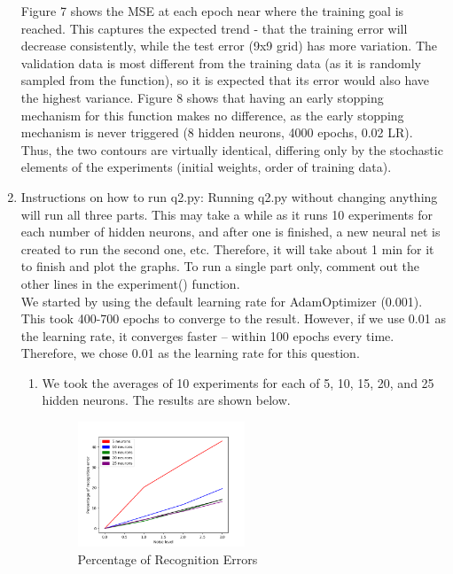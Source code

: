 \documentclass[11pt]{article}
\begin{document}
\begin{enumerate}
Figure 7 shows the MSE at each epoch near where the training goal is reached. This captures the expected trend - that the training error will decrease consistently, while the test error (9x9 grid) has more variation. The validation data is most different from the training data (as it is randomly sampled from the function), so it is expected that its error would also have the highest variance.\newline
\newline
Figure 8 shows that having an early stopping mechanism for this function makes no difference, as the early stopping mechanism is never triggered (8 hidden neurons, 4000 epochs, 0.02 LR). Thus, the two contours are virtually identical, differing only by the stochastic elements of the experiments (initial weights, order of training data). 

\pagebreak
\item Instructions on how to run q2.py:\newline
\newline
Running q2.py without changing anything will run all three parts. This may take a while as it runs 10 experiments for each number of hidden neurons, and after one is finished, a new neural net is created to run the second one, etc. Therefore, it will take about 1 min for it to finish and plot the graphs. To run a single part only, comment out the other lines in the experiment() function.\\
We started by using the default learning rate for AdamOptimizer (0.001). This took 400-700 epochs to converge to the result. However, if we use 0.01 as the learning rate, it converges faster -- within 100 epochs every time. Therefore, we chose 0.01 as the learning rate for this question.\\

% 
\begin{enumerate}
\item We took the averages of 10 experiments for each of 5, 10, 15, 20, and 25 hidden neurons. The results are shown below.\newline

\begin{figure}[h!]
    \centering
     \includegraphics[width=0.5\textwidth]{q2-a-1}
        \caption{Percentage of Recognition Errors}
\end{figure}


\end{enumerate}
\end{enumerate}
\end{document}
